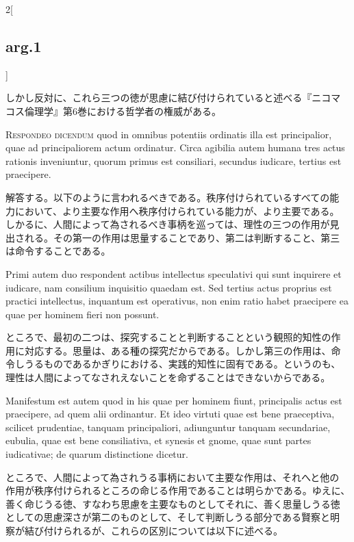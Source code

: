 \documentclass[paper=a4paper,fontsize=10pt,jafontsize=9pt,titlepage]{jlreq}
\begin{document}
\begin{paracol}{2}[\subsection{arg.1}]
\switchcolumn

しかし反対に、これら三つの徳が思慮に結び付けられていると述べる『ニコマ
コス倫理学』第6巻における哲学者の権威がある。


{\scshape Respondeo dicendum} quod in omnibus potentiis ordinatis illa
est principalior, quae ad principaliorem actum ordinatur. Circa
agibilia autem humana tres actus rationis inveniuntur, quorum primus
est consiliari, secundus iudicare, tertius est praecipere.

\switchcolumn

解答する。以下のように言われるべきである。秩序付けられているすべての能
力において、より主要な作用へ秩序付けられている能力が、より主要である。
しかるに、人間によって為されるべき事柄を巡っては、理性の三つの作用が見
出される。その第一の作用は思量することであり、第二は判断すること、第三
は命令することである。

\switchcolumn*

Primi autem duo respondent actibus intellectus speculativi qui sunt
inquirere et iudicare, nam consilium inquisitio quaedam est. Sed
tertius actus proprius est practici intellectus, inquantum est
operativus, non enim ratio habet praecipere ea quae per hominem fieri
non possunt.

\switchcolumn

ところで、最初の二つは、探究することと判断することという観照的知性の作
用に対応する。思量は、ある種の探究だからである。しかし第三の作用は、命
令しうるものであるかぎりにおける、実践的知性に固有である。というのも、
理性は人間によってなされえないことを命ずることはできないからである。

\switchcolumn*

Manifestum est autem quod in his quae per hominem fiunt, principalis
actus est praecipere, ad quem alii ordinantur. Et ideo virtuti quae
est bene praeceptiva, scilicet prudentiae, tanquam principaliori,
adiunguntur tanquam secundariae, eubulia, quae est bene consiliativa,
et synesis et gnome, quae sunt partes iudicativae; de quarum
distinctione dicetur.

\switchcolumn

ところで、人間によって為されうる事柄において主要な作用は、それへと他の
作用が秩序付けられるところの命じる作用であることは明らかである。ゆえに、
善く命じうる徳、すなわち思慮を主要なものとしてそれに、善く思量しうる徳
としての思慮深さが第二のものとして、そして判断しうる部分である賢察と明
察が結び付けられるが、これらの区別については以下に述べる。


\end{paracol}
\end{document}
